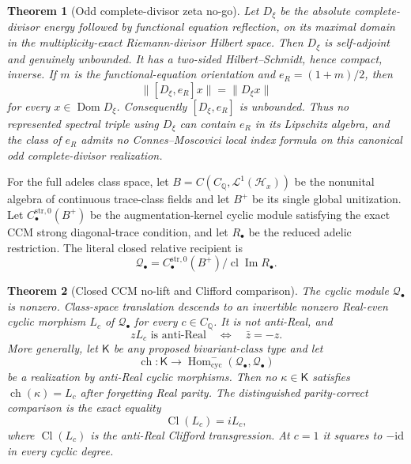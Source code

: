 \documentclass[11pt,reqno]{amsart}
\newtheorem{theorem}{Theorem}[section]
\newcommand{\Q}{\mathbb Q}
\newcommand{\Dom}{\operatorname{Dom}}
\newcommand{\im}{\operatorname{Im}}
\newcommand{\clos}{\operatorname{cl}}
\newcommand{\cH}{\mathcal H}
\newcommand{\id}{\mathrm{id}}
\begin{document}
\begin{theorem}[Odd complete-divisor zeta no-go]\label{thm:p1}
Let $D_\xi$ be the absolute complete-divisor energy followed by functional equation reflection,
on its maximal domain in the multiplicity-exact Riemann-divisor Hilbert space.  Then $D_\xi$ is
self-adjoint and genuinely unbounded.  It has a two-sided Hilbert--Schmidt, hence compact, inverse.
If $m$ is the functional-equation orientation and $e_R=(1+m)/2$, then
\[
                  \|[D_\xi,e_R]x\|=\|D_\xi x\|       \tag{1.13}
\]
for every $x\in\Dom D_\xi$.  Consequently $[D_\xi,e_R]$ is unbounded.  Thus no represented
spectral triple using $D_\xi$ can contain $e_R$ in its Lipschitz algebra, and the class of $e_R$
admits no Connes--Moscovici local index formula on this canonical odd complete-divisor
realization.
\end{theorem}

For the full adeles class space, let $B=C(C_\Q,\mathcal L^1(\cH_x))$ be the nonunital algebra of
continuous trace-class fields and let $B^+$ be its single global unitization.  Let
$C_\bullet^{\mathrm{str},0}(B^+)$ be the augmentation-kernel cyclic module satisfying the exact
CCM strong diagonal-trace condition, and let $R_\bullet$ be the reduced adelic restriction.  The
literal closed relative recipient is
\[
 \mathcal Q_\bullet=
 C_\bullet^{\mathrm{str},0}(B^+)/\clos\im R_\bullet. \tag{1.14}
\]

\begin{theorem}[Closed CCM no-lift and Clifford comparison]\label{thm:p2}
The cyclic module $\mathcal Q_\bullet$ is nonzero.  Class-space translation descends to an
invertible nonzero Real-even cyclic morphism $L_c$ of $\mathcal Q_\bullet$ for every $c\in C_\Q$.
It is not anti-Real, and
\[
                 zL_c\text{ is anti-Real}\quad\Longleftrightarrow\quad \bar z=-z. \tag{1.15}
\]
More generally, let $\mathsf K$ be any proposed bivariant-class type and let
\[
 \operatorname{ch}:\mathsf K\longrightarrow
 \operatorname{Hom}_{\mathrm{cyc}}^{-}
   (\mathcal Q_\bullet,\mathcal Q_\bullet)
\]
be a realization by anti-Real cyclic morphisms.
Then no $\kappa\in\mathsf K$ satisfies $\operatorname{ch}(\kappa)=L_c$ after forgetting Real
parity.  The distinguished parity-correct comparison is the exact equality
\[
                     \operatorname{Cl}(L_c)=iL_c,    \tag{1.16}
\]
where $\operatorname{Cl}(L_c)$ is the anti-Real Clifford transgression.  At $c=1$ it squares to
$-\id$ in every cyclic degree.
\end{theorem}
\end{document}
